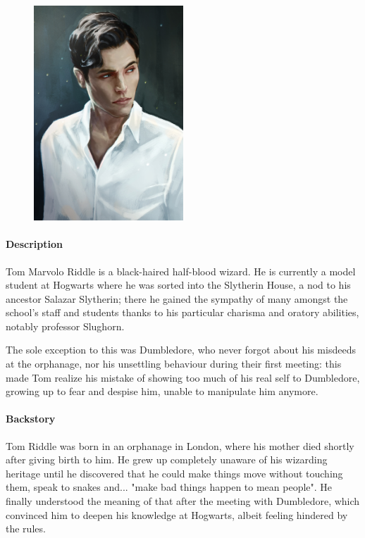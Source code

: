 \begin{figure}
\centering
\includegraphics[max width=0.5\textwidth]{../Pictures/Characters/Portraits/Tom_portrait.png}
\end{figure}

\paragraph{Description}
Tom Marvolo Riddle is a black-haired half-blood wizard. He is currently a model student at Hogwarts where he was sorted into the Slytherin House, a nod to his ancestor Salazar Slytherin; there he gained the sympathy of many amongst the school's staff and students thanks to his particular charisma and oratory abilities, notably professor Slughorn. 

The sole exception to this was Dumbledore, who never forgot about his misdeeds at the orphanage, nor his unsettling behaviour during their first meeting: this made Tom realize his mistake of showing too much of his real self to Dumbledore, growing up to fear and despise him, unable to manipulate him anymore.

\paragraph{Backstory}
Tom Riddle was born in an orphanage in London, where his mother died shortly after giving birth to him. He grew up completely unaware of his wizarding heritage until he discovered that he could make things move without touching them, speak to snakes and... "make bad things happen to mean people". He finally understood the meaning of that after the meeting with Dumbledore, which convinced him to deepen his knowledge at Hogwarts, albeit feeling hindered by the rules.

